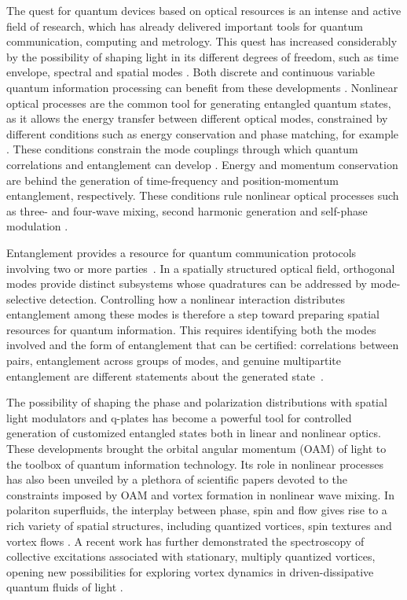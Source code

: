 \documentclass[%
 reprint,
 amsmath,amssymb,
 aps,
pra,
twocolumn,
]{revtex4-2}
\begin{document}
The quest for quantum devices based on optical resources is an intense and active field of research, which has already delivered important tools for quantum communication, computing and metrology. This quest has increased considerably by the possibility of shaping light in its different degrees of freedom, such as time envelope, spectral and spatial modes \cite{Wilner2015,Fickler2018}. Both discrete and continuous variable quantum information processing can benefit from these developments \cite{Coutinho2009,Gao2014,Gao2018}. Nonlinear optical processes are the common tool for generating entangled quantum states, as it allows the energy transfer between different optical modes, constrained by different conditions such as energy conservation and phase matching, for example \cite{boyd2020nonlinear,Sonja2020,Sonja2021,Sonja2025,Sonja2026}. These conditions constrain the mode couplings through which quantum correlations and entanglement can develop \cite{Jing2019,Jing2020,Jing-Treps-Fabre2020,Jing2021}. Energy and momentum conservation are behind the generation of time-frequency and position-momentum entanglement, respectively. These conditions rule nonlinear optical processes such as three- and four-wave mixing, second harmonic generation and self-phase modulation \cite{Pereira2017,Buono2020,Braian2021-Nanoph,Tabosa1999,Tabosa2003,Tabosa2015,Kaiser2018,Tabosa2023,Motta2022,Motta2023,Motta2024}.

Entanglement provides a resource for quantum communication protocols involving two or more parties~\cite{vanloock2003detecting}. In a spatially structured optical field, orthogonal modes provide distinct subsystems whose quadratures can be addressed by mode-selective detection. Controlling how a nonlinear interaction distributes entanglement among these modes is therefore a step toward preparing spatial resources for quantum information. This requires identifying both the modes involved and the form of entanglement that can be certified: correlations between pairs, entanglement across groups of modes, and genuine multipartite entanglement are different statements about the generated state~\cite{teh2014criteria}.

The possibility of shaping the phase and polarization distributions with spatial light modulators and q-plates has become a powerful tool for controlled generation of customized entangled states both in linear and nonlinear optics. These developments brought the orbital angular momentum (OAM) of light to the toolbox of quantum information technology. Its role in nonlinear processes has also been unveiled by a plethora of scientific papers devoted to the constraints imposed by OAM and vortex formation in nonlinear wave mixing.
In polariton superfluids, the interplay between phase, spin and flow gives rise to a rich variety of spatial structures, including quantized vortices, spin textures and vortex flows \cite{Bramati2016,Bramati2016-2,Bramati2019,Bramati2020,Guerrero2025}. A recent work has further demonstrated the spectroscopy of collective excitations associated with stationary, multiply quantized vortices, opening new possibilities for exploring vortex dynamics in driven-dissipative quantum fluids of light \cite{Guerrero2025}.
\end{document}
